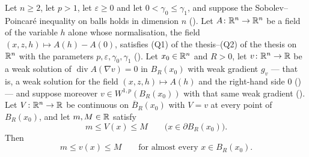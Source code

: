 \begin{lemma}
Let $n\ge2$, let $p>1$, let $\varepsilon\ge0$ and let $0<\gamma_0\le\gamma_1$,
and suppose the Sobolev--Poincar\'e inequality on balls holds in dimension $n$
().  Let $A\colon\mathbb{R}^n\to\mathbb{R}^n$ be a field of
the variable $h$ alone whose normalisation, the field
$(x,z,h)\mapsto A(h)-A(0)$, satisfies (Q1) of the thesis--(Q2) of the thesis on $\mathbb{R}^n$
with the parameters $p,\varepsilon,\gamma_0,\gamma_1$
().  Let $x_0\in\mathbb{R}^n$ and $R>0$, let
$v\colon\mathbb{R}^n\to\mathbb{R}$ be a weak solution of $\operatorname{div}A(\nabla v)=0$ in
$B_R(x_0)$ with weak gradient $g_v$ --- that is, a weak solution for the field
$(x,z,h)\mapsto A(h)$ and the right-hand side $0$
() --- and suppose moreover
$v\in W^{1,p}(B_R(x_0))$ with that same weak gradient ().
Let $V\colon\mathbb{R}^n\to\mathbb{R}$ be continuous on $\overline B_R(x_0)$ with $V=v$ at
every point of $B_R(x_0)$, and let $m,M\in\mathbb{R}$ satisfy
\[
m\le V(x)\le M\qquad\bigl(x\in\partial B_R(x_0)\bigr).
\]
Then
\[
m\le v(x)\le M\qquad\text{for almost every }x\in B_R(x_0).
\]
\end{lemma}
